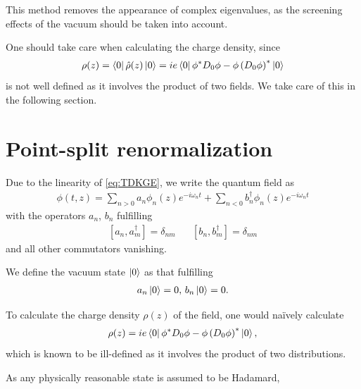 
This method removes the appearance of complex eigenvalues, as the screening effects of the vacuum should be taken into account.

One should take care when calculating the charge density, since 
\begin{align}
	\rho(z) = \bra{0}\hat{\rho}(z)\ket{0} = ie\bra{0}\phi^* D_0 \phi - \phi \left( D_0 \phi \right) ^*\ket{0}
\end{align}
is not well defined as it involves the product of two fields. We take care of this in the following section.

\section{Point-split renormalization}

Due to the linearity of \eqref{eq:TDKGE}, we write the quantum field as 
\begin{align}
	\phi(t, z) = 
	\sum_{n>0}^{} a_n \phi_n(z) e^{-i\omega_n t}
	+ \sum_{n<0}^{} b_n^\dagger \phi_n(z) e^{-i\omega_n t}
\end{align}
with the operators $a_n$, $b_n$ fulfilling 
\begin{align}
	\left[ a_n, a_m^\dagger \right]  = \delta_{nm} \,\,\,\,\,\,\,\,\,\,
	\left[ b_n, b_m^\dagger \right]  = \delta_{nm}
\end{align}
and all other commutators vanishing.

We define the vacuum state $\ket{0}$ as that fulfilling 
\begin{align}
	a_n\ket{0} = 0, \,b_n\ket{0} = 0.
\end{align}

To calculate the charge density $\rho(z)$ of the field, one would naïvely calculate 
\begin{align}
	\rho(z) = ie\bra{0}\phi^* D_0 \phi - \phi \left( D_0 \phi \right) ^*\ket{0},
\end{align}
which is known to be ill-defined as it involves the product of two distributions.

As any physically reasonable state is assumed to be Hadamard, 

\section{}


